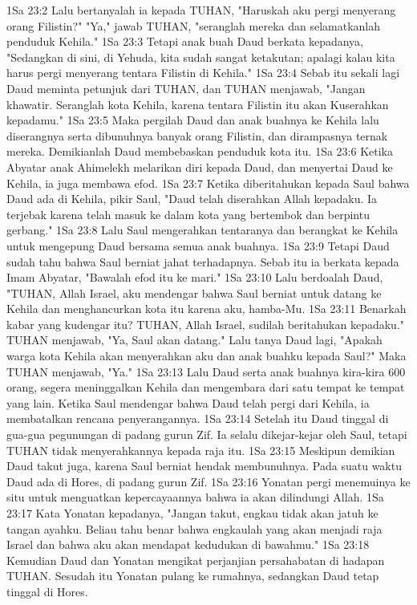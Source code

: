 1Sa 23:2  Lalu bertanyalah ia kepada TUHAN, "Haruskah aku pergi menyerang orang Filistin?" "Ya," jawab TUHAN, "seranglah mereka dan selamatkanlah penduduk Kehila."
1Sa 23:3  Tetapi anak buah Daud berkata kepadanya, "Sedangkan di sini, di Yehuda, kita sudah sangat ketakutan; apalagi kalau kita harus pergi menyerang tentara Filistin di Kehila."
1Sa 23:4  Sebab itu sekali lagi Daud meminta petunjuk dari TUHAN, dan TUHAN menjawab, "Jangan khawatir. Seranglah kota Kehila, karena tentara Filistin itu akan Kuserahkan kepadamu."
1Sa 23:5  Maka pergilah Daud dan anak buahnya ke Kehila lalu diserangnya serta dibunuhnya banyak orang Filistin, dan dirampasnya ternak mereka. Demikianlah Daud membebaskan penduduk kota itu.
1Sa 23:6  Ketika Abyatar anak Ahimelekh melarikan diri kepada Daud, dan menyertai Daud ke Kehila, ia juga membawa efod.
1Sa 23:7  Ketika diberitahukan kepada Saul bahwa Daud ada di Kehila, pikir Saul, "Daud telah diserahkan Allah kepadaku. Ia terjebak karena telah masuk ke dalam kota yang bertembok dan berpintu gerbang."
1Sa 23:8  Lalu Saul mengerahkan tentaranya dan berangkat ke Kehila untuk mengepung Daud bersama semua anak buahnya.
1Sa 23:9  Tetapi Daud sudah tahu bahwa Saul berniat jahat terhadapnya. Sebab itu ia berkata kepada Imam Abyatar, "Bawalah efod itu ke mari."
1Sa 23:10  Lalu berdoalah Daud, "TUHAN, Allah Israel, aku mendengar bahwa Saul berniat untuk datang ke Kehila dan menghancurkan kota itu karena aku, hamba-Mu.
1Sa 23:11  Benarkah kabar yang kudengar itu? TUHAN, Allah Israel, sudilah beritahukan kepadaku." TUHAN menjawab, "Ya, Saul akan datang." Lalu tanya Daud lagi, "Apakah warga kota Kehila akan menyerahkan aku dan anak buahku kepada Saul?" Maka TUHAN menjawab, "Ya."
1Sa 23:13  Lalu Daud serta anak buahnya kira-kira 600 orang, segera meninggalkan Kehila dan mengembara dari satu tempat ke tempat yang lain. Ketika Saul mendengar bahwa Daud telah pergi dari Kehila, ia membatalkan rencana penyerangannya.
1Sa 23:14  Setelah itu Daud tinggal di gua-gua pegunungan di padang gurun Zif. Ia selalu dikejar-kejar oleh Saul, tetapi TUHAN tidak menyerahkannya kepada raja itu.
1Sa 23:15  Meskipun demikian Daud takut juga, karena Saul berniat hendak membunuhnya. Pada suatu waktu Daud ada di Hores, di padang gurun Zif.
1Sa 23:16  Yonatan pergi menemuinya ke situ untuk menguatkan kepercayaannya bahwa ia akan dilindungi Allah.
1Sa 23:17  Kata Yonatan kepadanya, "Jangan takut, engkau tidak akan jatuh ke tangan ayahku. Beliau tahu benar bahwa engkaulah yang akan menjadi raja Israel dan bahwa aku akan mendapat kedudukan di bawahmu."
1Sa 23:18  Kemudian Daud dan Yonatan mengikat perjanjian persahabatan di hadapan TUHAN. Sesudah itu Yonatan pulang ke rumahnya, sedangkan Daud tetap tinggal di Hores.

